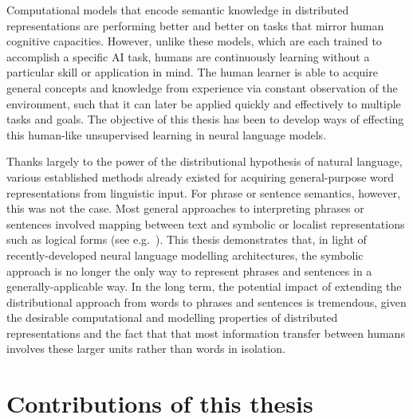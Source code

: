 


Computational models that encode semantic knowledge in distributed representations are performing better and better on tasks that mirror human cognitive capacities. However, unlike these models, which are each trained to accomplish a specific AI task, humans are continuously learning without a particular skill or application in mind. The human learner is able to acquire general concepts and knowledge from experience via constant observation of the environment, such that it can later be applied quickly and effectively to multiple tasks and goals. The objective of this thesis has been to develop ways of effecting this human-like unsupervised learning in neural language models.

Thanks largely to the power of the distributional hypothesis of natural language, various established methods already existed for acquiring general-purpose word representations from linguistic input. For phrase or sentence semantics, however, this was not the case. Most general approaches to interpreting phrases or sentences involved mapping between text and symbolic or localist representations such as logical forms (see e.g.~\citealt{poon2009unsupervised}). This thesis demonstrates that, in light of recently-developed neural language modelling architectures, the symbolic approach is no longer the only way to represent phrases and sentences in a generally-applicable way. In the long term, the potential impact of extending the distributional approach from words to phrases and sentences is tremendous, given the desirable computational and modelling properties of distributed representations and the fact that that most information transfer between humans involves these larger units rather than words in isolation. 

\section{Contributions of this thesis}

